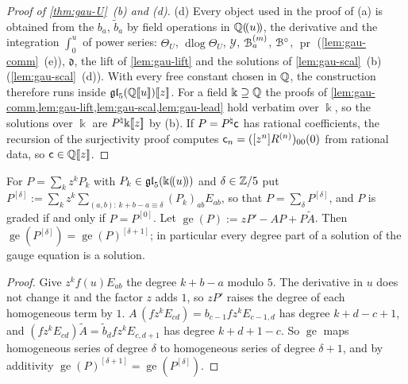 \begin{proof}[Proof of \cref{thm:gau-U}~(b) and (d)]
(d) Every object used in the proof of (a) is obtained from the $b_a$, $\tilde b_a$ by field operations in $\mathbb{Q}(\!(u)\!)$, the derivative and the integration $\int_0^u$ of power series: $\Theta_U$, $\operatorname{dlog}\Theta_U$, $\mathcal Y$, $\mathcal{B}^{(m)}_a$, $\mathcal{B}^\circ$, $\operatorname{pr}$ (\cref{lem:gau-comm}~(e)), $\mathfrak d$, the lift of \cref{lem:gau-lift} and the solutions of \cref{lem:gau-scal}~(b) (\cref{lem:gau-scal}~(d)). With every free constant chosen in $\mathbb{Q}$, the construction therefore runs inside $\mathfrak{gl}_5(\mathbb{Q}[\![ u ]\!])[\![ z ]\!]$. For a field $\Bbbk\supseteq\mathbb{Q}$ the proofs of \cref{lem:gau-comm,lem:gau-lift,lem:gau-scal,lem:gau-lead} hold verbatim over $\Bbbk$, so the solutions over $\Bbbk$ are $P^\natural\Bbbk[\![ z ]\!]$ by (b). If $P=P^\natural\mathsf{c}$ has rational coefficients, the recursion of the surjectivity proof computes $\mathsf{c}_n=([z^n]R^{(n)})_{00}(0)$ from rational data, so $\mathsf{c}\in\mathbb{Q}[\![ z ]\!]$.
\end{proof}

\begin{lem}
\label{lem:gau-degree}
For $P=\sum_kz^kP_k$ with $P_k\in\mathfrak{gl}_5(\Bbbk(\!(u)\!))$ and $\delta\in\mathbb{Z}/5$ put $P^{[\delta]}:=\sum_kz^k\sum_{(a,b):\,k+b-a\equiv\delta}(P_k)_{ab}E_{ab}$, so that $P=\sum_\delta P^{[\delta]}$, and $P$ is graded if and only if $P=P^{[0]}$. Let $\operatorname{ge}(P):=zP'-AP+P\tilde A$. Then $\operatorname{ge}(P^{[\delta]})=\operatorname{ge}(P)^{[\delta+1]}$; in particular every degree part of a solution of the gauge equation is a solution.
\end{lem}

\begin{proof}
Give $z^kf(u)E_{ab}$ the degree $k+b-a$ modulo $5$. The derivative in $u$ does not change it and the factor $z$ adds $1$, so $zP'$ raises the degree of each homogeneous term by $1$. $A\,(fz^kE_{cd})=b_{c-1}fz^kE_{c-1,d}$ has degree $k+d-c+1$, and $(fz^kE_{cd})\tilde A=\tilde b_dfz^kE_{c,d+1}$ has degree $k+d+1-c$. So $\operatorname{ge}$ maps homogeneous series of degree $\delta$ to homogeneous series of degree $\delta+1$, and by additivity $\operatorname{ge}(P)^{[\delta+1]}=\operatorname{ge}(P^{[\delta]})$.
\end{proof}

